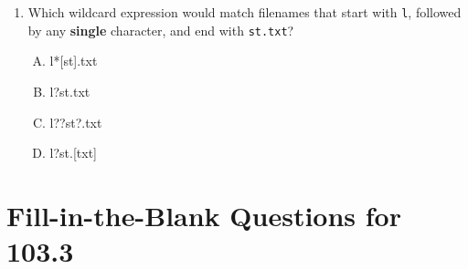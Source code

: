 \documentclass[a4paper]{report}
\begin{document}
\begin{enumerate}[1.]
    \item Which wildcard expression would match filenames that start with \texttt{l}, followed by any \textbf{single} character, and end with \texttt{st.txt}?  
    \begin{enumerate}[A)]
        \item l*[st].txt  
        \item l?st.txt  
        \item l??st?.txt  
        \item l?st.[txt]  
    \end{enumerate}

\end{enumerate}
\newpage
\section*{Fill-in-the-Blank Questions for 103.3}
\end{document}
